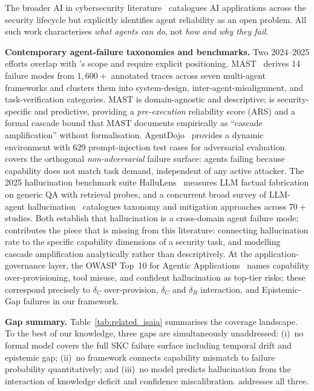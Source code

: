 The broader AI in cybersecurity literature~\cite{apruzzese2023} catalogues
AI applications across the security lifecycle but explicitly identifies
agent reliability as an open problem. All such work characterises
\textit{what agents can do}, not \textit{how and why they fail}.

\textbf{Contemporary agent-failure taxonomies and benchmarks.}
Two 2024--2025 efforts overlap with \ARES{}'s scope and require
explicit positioning. MAST~\cite{cemri2025mast} derives 14
failure modes from $1{,}600{+}$ annotated traces across seven
multi-agent frameworks and clusters them into system-design,
inter-agent-misalignment, and task-verification categories.
MAST is domain-agnostic and descriptive; \ARES{} is security-specific
and predictive, providing a \textit{pre-execution} reliability
score (ARS) and a formal cascade bound that MAST documents
empirically as ``cascade amplification'' without formalisation.
AgentDojo~\cite{debenedetti2024agentdojo} provides a dynamic
environment with 629 prompt-injection test cases for adversarial
evaluation. \ARES{} covers the orthogonal \textit{non-adversarial}
failure surface: agents failing because capability does not match
task demand, independent of any active attacker. The 2025
hallucination benchmark suite HalluLens~\cite{bang2025hallulens}
measures LLM factual fabrication on generic QA with retrieval
probes, and a concurrent broad survey of LLM-agent
hallucination~\cite{llmagent_halluc_survey2025} catalogues
taxonomy and mitigation approaches across $70{+}$ studies. Both
establish that hallucination is a cross-domain agent failure
mode; \ARES{} contributes the piece that is missing from
this literature: connecting hallucination rate to the specific
capability dimensions of a security task, and modelling cascade
amplification analytically rather than descriptively. At the
application-governance layer, the OWASP Top~10 for Agentic
Applications~\cite{owasp2026agentic} names capability
over-provisioning, tool misuse, and confident hallucination as
top-tier risks; these correspond precisely to $\delta_C$
over-provision, $\delta_C$ and $\delta_R$ interaction, and
Epistemic-Gap failures in our framework.

\textbf{Gap summary.}
Table~\ref{tab:related_isaia} summarises the coverage landscape. To the
best of our knowledge, three gaps are simultaneously unaddressed:
(i)~no formal model covers the full SKC failure surface including
temporal drift and epistemic gap; (ii)~no framework connects capability
mismatch to failure probability quantitatively; and (iii)~no model
predicts hallucination from the interaction of knowledge deficit and
confidence miscalibration. \ARES{} addresses all three.

